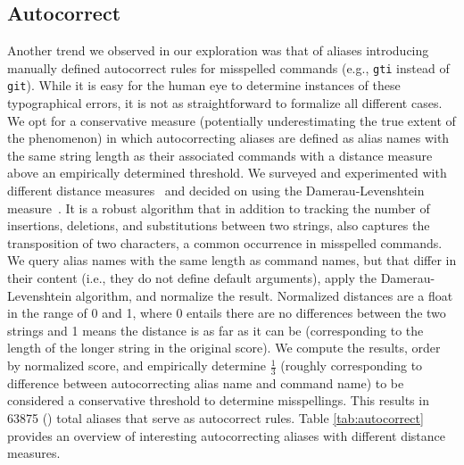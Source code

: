 \subsection{Autocorrect}

Another trend we observed in our exploration was that of aliases introducing manually defined autocorrect rules for misspelled commands (e.g., \verb|gti| instead of \verb|git|).
While it is easy for the human eye to determine instances of these typographical errors, it is not as straightforward to formalize all different cases.
We opt for a conservative measure (potentially underestimating the true extent of the phenomenon) in which autocorrecting aliases are defined as alias names with the same string length as their associated commands with a distance measure above an empirically determined threshold.
We surveyed and experimented with different distance measures~\cite{navarro:01} and decided on using the Damerau-Levenshtein measure~\cite{damerau:64}.
It is a robust algorithm that in addition to tracking the number of insertions, deletions, and substitutions between two strings, also captures the transposition of two characters, a common occurrence in misspelled commands.  
We query alias names with the same length as command names, but that differ in their content (i.e., they do not define default arguments), apply the Damerau-Levenshtein algorithm, and normalize the result.
Normalized distances are a float in the range of 0 and 1, where 0 entails there are no differences between the two strings and 1 means the distance is as far as it can be (corresponding to the length of the longer string in the original score).
We compute the results, order by normalized score, and empirically determine $\frac{1}{3}$ (roughly corresponding to  difference between autocorrecting alias name and command name) to be considered a conservative threshold to determine misspellings.
This results in \num{63875} () total aliases that serve as autocorrect rules.
Table \ref{tab:autocorrect} provides an overview of interesting autocorrecting aliases with different distance measures.


